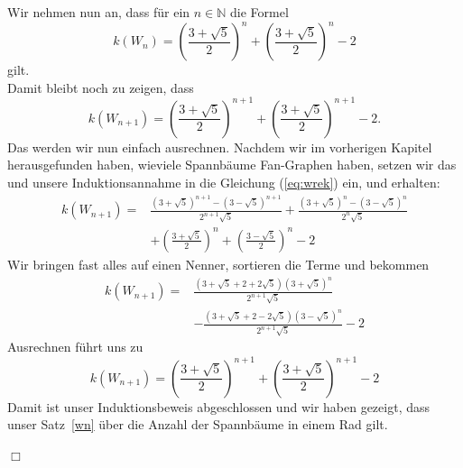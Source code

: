 Wir nehmen nun an, dass für ein $n \in \mathbb{N}$ die Formel 
\begin{equation}
 \mathit{k}\left(W_n\right) = \left(\frac{3+\sqrt{5}}{2}\right)^n+\left(\frac{3+\sqrt{5}}{2}\right)^n-2
\end{equation}
gilt.\\
Damit bleibt noch zu zeigen, dass
\begin{equation}
 \mathit{k}\left(W_{n+1}\right) = \left(\frac{3+\sqrt{5}}{2}\right)^{n+1}+\left(\frac{3+\sqrt{5}}{2}\right)^{n+1}-2.
\end{equation}
Das werden wir nun einfach ausrechnen.
Nachdem wir im vorherigen Kapitel herausgefunden haben, wieviele Spannbäume Fan-Graphen haben, setzen wir das und unsere Induktionsannahme in die Gleichung (\ref{eq:wrek}) ein, und erhalten:\\
\begin{equation}
\begin{aligned}
\mathit{k}\left(W_{n+1}\right) ={} & \frac{\left(3+\sqrt{5}\right)^{n+1}-\left(3-\sqrt{5}\right)^{n+1}}{2^{n+1}\sqrt{5}} + \frac{\left(3+\sqrt{5}\right)^{n}-\left(3-\sqrt{5}\right)^{n}}{2^{n}\sqrt{5}}\\
& + \left(\frac{3+\sqrt{5}}{2}\right)^n+\left(\frac{3-\sqrt{5}}{2}\right)^n-2
\end{aligned}
\end{equation}
Wir bringen fast alles auf einen Nenner, sortieren die Terme und bekommen
\begin{equation}
\begin{aligned}
\mathit{k}\left(W_{n+1}\right) = {}  & \frac{\left(3+\sqrt{5}+2+2\sqrt{5}\right)\left(3+\sqrt{5}\right)^{n}}{2^{n+1}\sqrt{5}} \\%
                        & -\frac{\left(3+\sqrt{5}+2-2\sqrt{5}\right)\left(3-\sqrt{5}\right)^{n}}{2^{n+1}\sqrt{5}}-2 
\end{aligned}
\end{equation}
Ausrechnen führt uns zu\\
\begin{equation}
\mathit{k}\left(W_{n+1}\right) = \left(\frac{3+\sqrt{5}}{2}\right)^{n+1}+\left(\frac{3+\sqrt{5}}{2}\right)^{n+1}-2
\end{equation}
Damit ist unser Induktionsbeweis abgeschlossen und wir haben gezeigt, dass unser Satz~\ref{wn} über die Anzahl der Spannbäume in einem Rad gilt.
\begin{flushright} $\Box$ \end{flushright} 
